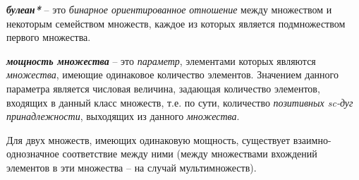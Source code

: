 \begin{SCn}
\end{SCn}
	
\textbf{\textit{булеан*}} – это \textit{бинарное ориентированное отношение} между множеством и некоторым семейством множеств, каждое из которых является подмножеством первого множества.

\begin{SCn}
\end{SCn}

\textbf{\textit{мощность множества}} – это \textit{параметр}, элементами которых являются \textit{множества}, имеющие одинаковое количество элементов. Значением данного параметра является числовая величина, задающая количество элементов, входящих в данный класс множеств, т.е. по сути, количество \textit{позитивных sc-дуг принадлежности}, выходящих из данного \textit{множества}.
	
	Для двух множеств, имеющих одинаковую мощность, существует взаимно-однозначное соответствие между ними (между множествами вхождений элементов в эти множества – на случай мультимножеств).

